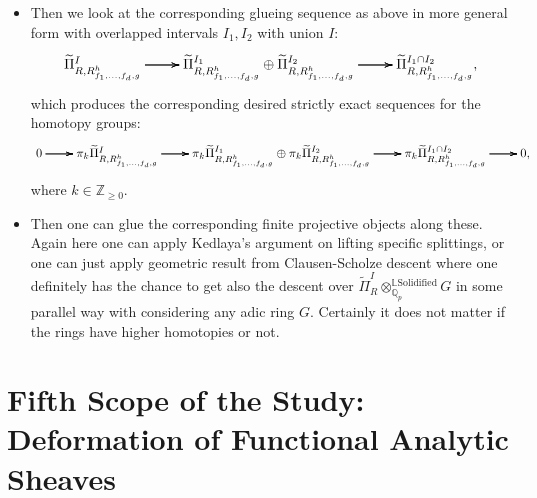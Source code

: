 \documentclass[11pt]{report}
\begin{document}
\begin{itemize}
\justifying
\item<1-> Then we look at the corresponding glueing sequence as above in more general form with overlapped intervals $I_1,I_2$ with union $I$:
\[
\xymatrix@R+0pc@C+0pc{
\widetilde{\Pi}^I_{R,R^h_{f_1,...,f_d,g}} \ar[r]\ar[r]\ar[r] &\widetilde{\Pi}^{I_1}_{R,R^h_{f_1,...,f_d,g}}\oplus \widetilde{\Pi}^{I_2}_{R,R^h_{f_1,...,f_d,g}} \ar[r]\ar[r]\ar[r] &\widetilde{\Pi}^{I_1\cap I_2}_{R,R^h_{f_1,...,f_d,g}},
}
\] 
which produces the corresponding desired strictly exact sequences for the homotopy groups:
\[
\xymatrix@R+0pc@C-0.2pc{
0\ar[r]\ar[r]\ar[r]  &\pi_k\widetilde{\Pi}^I_{R,R^h_{f_1,...,f_d,g}} \ar[r]\ar[r]\ar[r] &\pi_k\widetilde{\Pi}^{I_1}_{R,R^h_{f_1,...,f_d,g}}\oplus \pi_k\widetilde{\Pi}^{I_2}_{R,R^h_{f_1,...,f_d,g}} \ar[r]\ar[r]\ar[r] &\pi_k\widetilde{\Pi}^{I_1\cap I_2}_{R,R^h_{f_1,...,f_d,g}} \ar[r]\ar[r]\ar[r]  &0,
}
\]
where $k\in \mathbb{Z}_{\geq 0}$. 

\item<2-> Then one can glue the corresponding finite projective objects along these. Again here one can apply Kedlaya's argument on lifting specific splittings, or one can just apply geometric result from Clausen-Scholze descent \cite[Theorem 14.9, Remark 14.10]{CS2} where one definitely has the chance to get also the descent over $\widetilde{\Pi}^I_{R}{\otimes}_{\mathbb{Q}_p}^{\mathbb{L}\mathrm{Solidified}}G$ in some parallel way with considering any adic ring $G$. Certainly it does not matter if the rings have higher homotopies or not. 


\end{itemize}






\newpage



\section{Fifth Scope of the Study: Deformation of Functional Analytic Sheaves}
\end{document}
